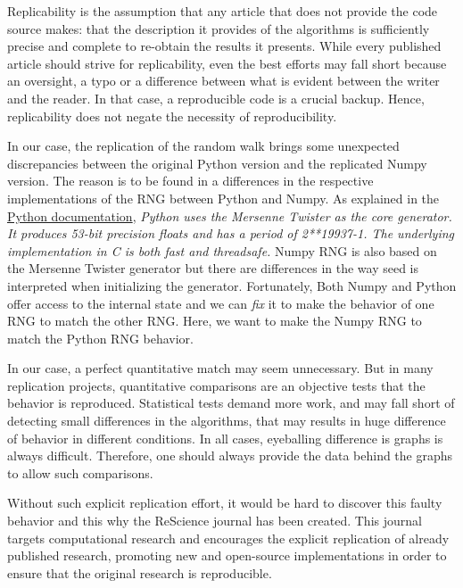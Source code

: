 \documentclass[a4paper,11pt]{article}
\begin{document}
Replicability is the assumption that any article that does not provide the code source makes: that the description it provides of the algorithms is sufficiently precise and complete to re-obtain the results it presents. While every published article should strive for replicability, even the best efforts may fall short because an oversight, a typo or a difference between what is evident between the writer and the reader. In that case, a reproducible code is a crucial backup. Hence, replicability does not negate the necessity of reproducibility. 

In our case, the replication of the random walk brings some unexpected discrepancies between the original Python version and the replicated Numpy version.
The reason is to be found in a differences in the respective implementations of the RNG between Python and Numpy.
As explained in the \href{https://docs.python.org/3.6/library/random.html}{Python documentation}, {\em Python uses the Mersenne Twister as the core generator. It produces 53-bit precision floats
and has a period of 2**19937-1.
The underlying implementation in C is both fast and threadsafe.}
Numpy RNG is also based on the Mersenne Twister generator but there are differences in the way seed is interpreted when initializing the generator.
Fortunately, Both Numpy and Python offer access to the internal state and we can {\em fix} it to make the behavior of one RNG to match the other RNG.
Here, we want to make the Numpy RNG to match the Python RNG behavior.

In our case, a perfect quantitative match may seem unnecessary. But in many replication projects, quantitative comparisons are an objective tests that the behavior is reproduced. Statistical tests demand more work, and may fall short of detecting small differences in the algorithms, that may results in huge difference of behavior in different conditions. In all cases, eyeballing difference is graphs is always difficult. Therefore, one should always provide the data behind the graphs to allow such comparisons.

Without such explicit replication effort, it would be hard to discover this faulty behavior and this why the ReScience journal has been created.
This journal targets computational research and encourages the explicit replication of already published research, promoting new and open-source implementations in order to ensure that the original research is reproducible.
\end{document}
